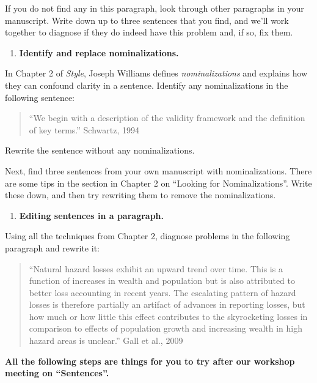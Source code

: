 \documentclass[]{tufte-book}
\providecommand{\tightlist}{%
  \setlength{\itemsep}{0pt}\setlength{\parskip}{0pt}}
\begin{document}
If you do not find any in this paragraph, look through other paragraphs in your
manuscript. Write down up to three sentences that you find, and we'll work together
to diagnose if they do indeed have this problem and, if so, fix them.

\begin{enumerate}
\def\labelenumi{\arabic{enumi}.}
\setcounter{enumi}{5}
\tightlist
\item
  \textbf{Identify and replace nominalizations.}
\end{enumerate}

In Chapter 2 of \emph{Style}, Joseph Williams defines \emph{nominalizations} and explains how
they can confound clarity in a sentence. Identify any nominalizations in the following
sentence:

\begin{quote}
``We begin with a description of the validity framework and the definition of
key terms.'' Schwartz, 1994
\end{quote}

Rewrite the sentence without any nominalizations.

Next, find three sentences from your own manuscript with nominalizations. There
are some tips in the section in Chapter 2 on ``Looking for Nominalizations''.
Write these down, and then try rewriting them to remove the nominalizations.

\begin{enumerate}
\def\labelenumi{\arabic{enumi}.}
\setcounter{enumi}{6}
\tightlist
\item
  \textbf{Editing sentences in a paragraph.}
\end{enumerate}

Using all the techniques from Chapter 2, diagnose problems in the following
paragraph and rewrite it:

\begin{quote}
``Natural hazard losses exhibit an upward trend over time. This is a function
of increases in wealth and population but is also attributed to better loss
accounting in recent years. The escalating pattern of hazard losses is therefore
partially an artifact of advances in reporting losses, but how much or how
little this effect contributes to the skyrocketing losses in comparison to
effects of population growth and increasing wealth in high hazard areas is
unclear.'' Gall et al., 2009
\end{quote}

\textbf{All the following steps are things for you to try after our workshop
meeting on ``Sentences''.}
\end{document}
